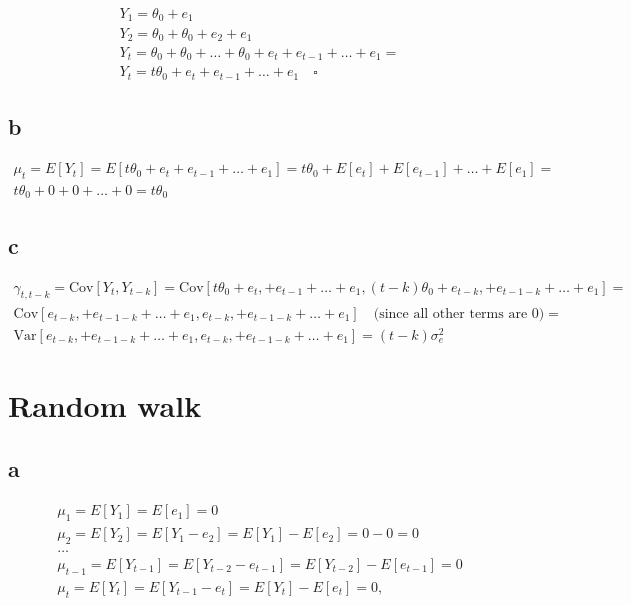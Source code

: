\documentclass[]{book}
\begin{document}
\begin{gather*}
  Y_{1} = \theta_0 + e_1\\
  Y_{2} = \theta_0 + \theta_0 + e_2 + e_1\\
  Y_{t} = \theta_0 + \theta_0 + \dots + \theta_0 + e_{t} + e_{t-1} + \dots+ e_1 = \\
  Y_{t} = t \theta_0 + e_t + e_{t-1} + \dots + e_1 \quad \square
\end{gather*}

\subsection*{b}\label{b-13}

\begin{gather*}
  \mu_t = E[Y_t] = E[t \theta_0 + e_t + e_{t-1} + \dots + e_1] = t\theta_0 + E[e_t] + E[e_{t-1}] + \dots + E[e_1] = \\
  t\theta_0 + 0 + 0 + \dots + 0 = t \theta_0
\end{gather*}

\subsection*{c}\label{c-7}

\begin{gather*}
  \gamma_{t,t-k} = \text{Cov}[Y_t, Y_{t-k}] = \text{Cov}[t\theta_0 + e_t, + e_{t-1} + \dots + e_1, (t-k)\theta_0 + e_{t-k}, + e_{t-1-k} + \dots + e_1] = \\
   \text{Cov}[e_{t-k}, + e_{t-1-k} + \dots + e_1, e_{t-k}, + e_{t-1-k} + \dots + e_1] \quad \text{(since all other terms are 0)} =\\
   \text{Var}[e_{t-k}, + e_{t-1-k} + \dots + e_1, e_{t-k}, + e_{t-1-k} + \dots + e_1] = (t-k)\sigma_e^2
\end{gather*}

\section{Random walk}\label{random-walk}

\subsection*{a}\label{a-14}

\begin{gather*}
  \mu_1 = E[Y_1] = E[e_1] = 0\\
  \mu_2 = E[Y_2] = E[Y_1 - e_2] = E[Y_1] - E[e_2] = 0 - 0 = 0\\
  \dots\\
  \mu_{t-1} = E[Y_{t-1}] = E[Y_{t-2} - e_{t-1}] = E[Y_{t-2}] - E[e_{t-1}] = 0 \\
  \mu_t = E[Y_t] = E[Y_{t-1} - e_t] = E[Y_t] - E[e_t] = 0,
\end{gather*}
\end{document}

